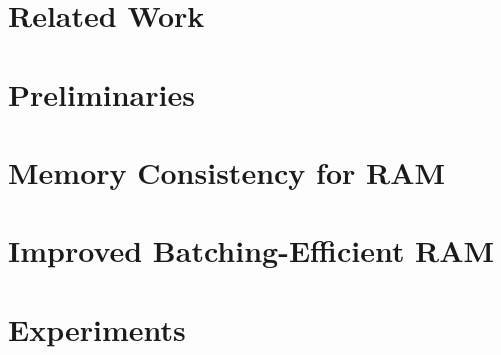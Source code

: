 \documentclass[sigconf]{acmart}
\begin{document}




\section{Related Work}\label{sec:rel-work}
	

\section{Preliminaries}\label{sec:prelims}
    

	

\section{Memory Consistency for RAM}\label{sec:model-for-ram}


\section{Improved Batching-Efficient RAM}\label{sec:batch-efficient-ram}


\section{Experiments}\label{sec:experiments}




\appendix

\end{document}
